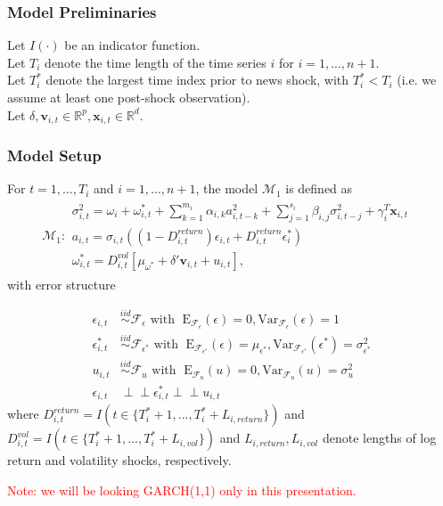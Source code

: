 \documentclass[9pt]{beamer}
\newcommand{\x}{\textbf{x}}
\newcommand{\simiid}{\stackrel{iid}{\sim}} %
\newcommand{\indep}{\perp \!\!\! \perp } %
\def\mrm#1{\mathrm{#1}} %
\def\mc#1{\mathcal{#1}} %
\def\mc#1{\mathcal{#1}}
\theoremstyle{definition}
\begin{document}
\begin{frame}
    \frametitle{Model Preliminaries}

    \fontsize{8}{7.2}

    Let $I(\cdot)$ be an indicator function.  \\
\bigbreak
    Let $T_i$ denote the time length of the time series $i$ for $i = 1, \ldots, n+1$.\\
    \bigbreak
    Let $T_i^*$ denote the largest time index prior to news shock, with $T_i^* < T_i$ (i.e. we assume at least one post-shock observation). \\
    \bigbreak
    Let $\delta, \textbf{v}_{i,t} \in \mathbb{R}^{p},  \x_{i,t} \in \mathbb{R}^{d}$.  
\end{frame}

\begin{frame}
\frametitle{Model Setup}

\fontsize{6}{7.2}

For $t= 1, \ldots, T_i$ and $i = 1, \ldots, n+1$, the model $\mc{M}_1$ is defined as 
\begin{align*}
  \mc{M}_1 \colon \begin{array}{l}
     \sigma^{2}_{i,t} = \omega_{i} + \omega^{*}_{i,t} + \sum^{m_{i}}_{k=1}\alpha_{i,k}a^{2}_{i,t-k} + \sum_{j=1}^{s_{i}}\beta_{i,j}\sigma_{i,t-j}^{2} + \gamma_{i}^{T} \x_{i,t} \text{ }\\[.2cm]
     a_{i,t} = \sigma_{i,t}((1-D^{return}_{i,t})\epsilon_{i,t} + D^{return}_{i,t}\epsilon^{*}_{i})\\[.2cm]
    \omega_{i,t}^{*} = D^{vol}_{i,t}[\mu_{\omega^{*}}+\delta'\textbf{v}_{i, t}+ u_{i,t}],
  \end{array}
  \end{align*}\label{model_1}
with error structure

  \begin{align*}
    \epsilon_{i,t} &\simiid \mc{F}_{\epsilon} \text{ with }  \; \mrm{E}_{\mc{F}_{\epsilon}}(\epsilon) = 0, \mrm{Var}_{\mc{F}_{\epsilon}}(\epsilon)  = 1  \\
    \epsilon^{*}_{i,t} &\simiid \mc{F}_{\epsilon^{*}} \text{ with }  \; \mrm{E}_{\mc{F}_{\epsilon^{*}}}(\epsilon) = \mu_{\epsilon^{*}}, \mrm{Var}_{\mc{F}_{\epsilon^{*}}}(\epsilon^{*})  = \sigma^2_{\epsilon^{*}}  \\
    u_{i,t} & \simiid  \mc{F}_{u} \text{ with }  \; \mrm{E}_{\mc{F}_{u}}(u) = 0, \mrm{Var}_{\mc{F}_{u}}(u) = \sigma^2_{u}\\
    \epsilon_{i,t} & \indep  \epsilon^{*}_{i,t}  \indep u_{i,t}
    \end{align*}
where $D^{return}_{i,t} = I(t \in \{T_i^* + 1,...,T_i^* + L_{i, return}\})$ and $D^{vol}_{i,t} = I(t \in \{T_i^* + 1,...,T_i^* + L_{i, vol}\})$ and $L_{i,return},L_{i,vol}$ denote lengths of log return and volatility shocks, respectively.  

\bigbreak

\textcolor{red}{Note: we will be looking GARCH(1,1) only in this presentation.}
\end{frame}
\end{document}

